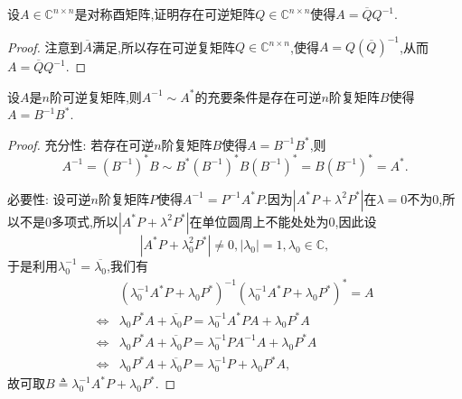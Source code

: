\documentclass[../../main.tex]{subfiles}
\begin{document}
\begin{proposition}
设\( A \in \mathbb{C}^{n \times n} \)是对称酉矩阵,证明存在可逆矩阵\( Q \in \mathbb{C}^{n \times n} \)使得\( A = \overline{Q} Q^{-1} \).
\end{proposition}
\begin{proof}
注意到\( \overline{A} \)满足,所以存在可逆复矩阵\( Q \in \mathbb{C}^{n \times n} \),使得\( A = Q (\overline{Q})^{-1} \),从而\( A = \overline{Q} Q^{-1} \).
\end{proof}

\begin{theorem}[]\label{theorem:}
设\( A \)是\( n \)阶可逆复矩阵,则\( A^{-1} \sim A^* \)的充要条件是存在可逆\( n \)阶复矩阵\( B \)使得\( A = B^{-1} B^* \).
\end{theorem}
\begin{proof}
{\heiti 充分性:} 若存在可逆\( n \)阶复矩阵\( B \)使得\( A = B^{-1} B^* \),则
\[
A^{-1} = (B^{-1})^* B \sim B^* (B^{-1})^* B (B^{-1})^* = B (B^{-1})^* = A^*.
\]

{\heiti 必要性:} 设可逆\( n \)阶复矩阵\( P \)使得\( A^{-1} = P^{-1} A^* P \).因为\( |A^* P + \lambda^2 P^*| \)在\( \lambda = 0 \)不为0,所以不是0多项式,所以\( |A^* P + \lambda^2 P^*| \)在单位圆周上不能处处为0,因此设
\[
|A^* P + \lambda_0^2 P^*| \neq 0, |\lambda_0| = 1, \lambda_0 \in \mathbb{C},
\]
于是利用\( \lambda_0^{-1} = \overline{\lambda_0} \),我们有
\[
\begin{aligned}
& (\lambda_0^{-1} A^* P + \lambda_0 P^*)^{-1} (\lambda_0^{-1} A^* P + \lambda_0 P^*)^* = A \\
\Leftrightarrow & \lambda_0 P^* A + \overline{\lambda_0} P = \lambda_0^{-1} A^* P A + \lambda_0 P^* A \\
\Leftrightarrow & \lambda_0 P^* A + \overline{\lambda_0} P = \lambda_0^{-1} P A^{-1} A + \lambda_0 P^* A \\
\Leftrightarrow & \lambda_0 P^* A + \overline{\lambda_0} P = \lambda_0^{-1} P + \lambda_0 P^* A,
\end{aligned}
\]
故可取\( B \triangleq \lambda_0^{-1} A^* P + \lambda_0 P^* \).
\end{proof}
\end{document}
